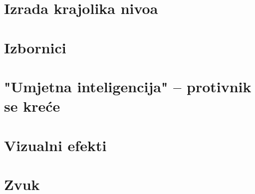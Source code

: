 \documentclass[a4paper,10pt]{article}
\begin{document}
\pagebreak
\section{Izrada krajolika nivoa}

\pagebreak
\section{Izbornici}

\pagebreak
\section{"Umjetna inteligencija" -- protivnik se kreće}

\pagebreak
\section{Vizualni efekti}

\pagebreak
\section{Zvuk}

\printindex
\end{document}
